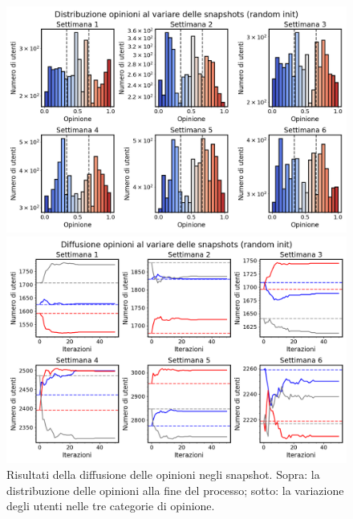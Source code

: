 \documentclass[sigchi]{acmart}
\begin{document}
\begin{figure}[h]
    \centering
    \begin{minipage}{0.48\textwidth}
        \centering
        \includegraphics[width=\linewidth]{img/Distribuzione opinioni al variare delle snapshots (random init).png}
    \end{minipage}
    \hfill
    \begin{minipage}{0.48\textwidth}
        \centering
        \includegraphics[width=\linewidth]{img/Diffusione opinioni al variare delle snapshots (random init).png}
    \end{minipage}
    \caption{Risultati della diffusione delle opinioni negli snapshot. Sopra: la distribuzione delle opinioni alla fine del processo; sotto: la variazione degli utenti nelle tre categorie di opinione. \label{fig:opinion_diffusion_snapshot}}
\end{figure}
\end{document}
